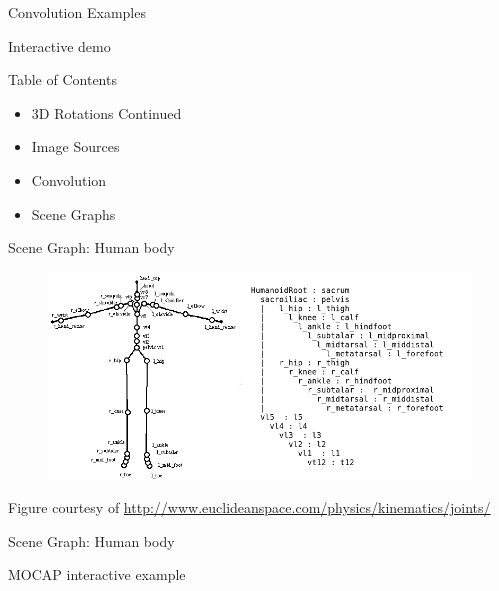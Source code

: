 \documentclass{beamer}
\begin{document}
\begin{frame}{Convolution Examples}

Interactive demo

\end{frame}


\begin{frame}{Table of Contents}

\begin{itemize}[label=$\vartriangleright$]
	\item 3D Rotations Continued
    \item Image Sources
	\item Convolution
\end{itemize}
\begin{itemize}[label=$\blacktriangleright$]
	\item Scene Graphs
\end{itemize}


\end{frame}


\begin{frame}{Scene Graph: Human body}

\begin{figure}[t]
	\centering
    \includegraphics[width=\textwidth]{MPEG4Diagram.png}
\end{figure}


\tiny Figure courtesy of \url{http://www.euclideanspace.com/physics/kinematics/joints/}

\end{frame}

\begin{frame}{Scene Graph: Human body}

MOCAP interactive example

\end{frame}
\end{document}
